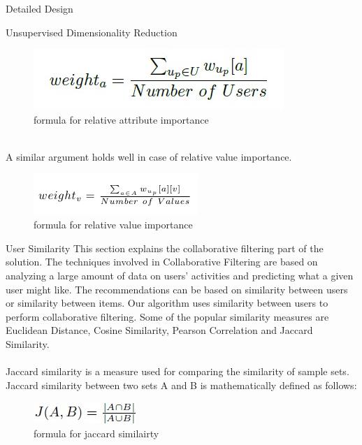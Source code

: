 \documentclass{report}
\begin{document}
\begin{projChapter}{Detailed Design}
\begin{projSection}{Unsupervised Dimensionality Reduction}
            \begin{figure}[ht!]
\centering
\includegraphics[scale=0.6]{images/attribImportance.png}
\caption{formula for relative attribute importance}
\label{attribImp}
\end{figure}

            ~\\
            A similar argument holds well in case of relative value importance.
            \begin{figure}[ht!]
\centering
\includegraphics[scale=0.6]{images/valueImportance.png}
\caption{formula for relative value importance}
\label{valueImp}
\end{figure}

\end{projSection}
\begin{projSection}{User Similarity}
            This section explains the collaborative filtering part of the solution. The techniques involved in Collaborative Filtering are based on analyzing a large amount of data on users' activities and predicting what a given user might like. The recommendations can be based on similarity between users or similarity between items. Our algorithm uses similarity between users to perform collaborative filtering. Some of the popular similarity measures are Euclidean Distance, Cosine Similarity, Pearson Correlation and Jaccard Similarity.
            ~\\\\
            Jaccard similarity is a measure used for comparing the similarity of sample sets. Jaccard similarity between two sets A and B is mathematically defined as follows:
            \begin{figure}[ht!]
\centering
\includegraphics[scale=0.7]{images/jaccard.png}
\caption{formula for jaccard similairty}
\label{jaccard}
\end{figure}


\end{projSection}
\end{projChapter}
\end{document}

